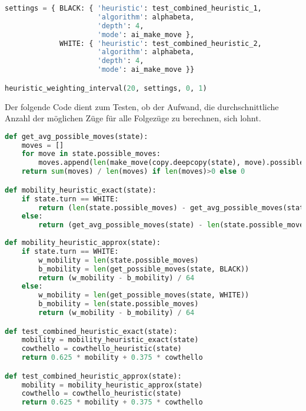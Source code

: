 \begin{lstlisting}[language=Python]
settings = { BLACK: { 'heuristic': test_combined_heuristic_1,
                      'algorithm': alphabeta,
                      'depth': 4,
                      'mode': ai_make_move },
             WHITE: { 'heuristic': test_combined_heuristic_2,
                      'algorithm': alphabeta,
                      'depth': 4,
                      'mode': ai_make_move }}

heuristic_weighting_interval(20, settings, 0, 1)
\end{lstlisting}

Der folgende Code dient zum Testen, ob der Aufwand, die
durchschnittliche Anzahl der möglichen Züge für alle Folgezüge zu
berechnen, sich lohnt.

\begin{lstlisting}[language=Python]
def get_avg_possible_moves(state):
    moves = []
    for move in state.possible_moves:
        moves.append(len(make_move(copy.deepcopy(state), move).possible_moves))
    return sum(moves) / len(moves) if len(moves)>0 else 0

def mobility_heuristic_exact(state):
    if state.turn == WHITE:
        return (len(state.possible_moves) - get_avg_possible_moves(state)) / 64
    else:
        return (get_avg_possible_moves(state) - len(state.possible_moves)) / 64
    
def mobility_heuristic_approx(state):
    if state.turn == WHITE:
        w_mobility = len(state.possible_moves)
        b_mobility = len(get_possible_moves(state, BLACK))
        return (w_mobility - b_mobility) / 64
    else:
        w_mobility = len(get_possible_moves(state, WHITE))
        b_mobility = len(state.possible_moves)
        return (w_mobility - b_mobility) / 64

def test_combined_heuristic_exact(state):
    mobility = mobility_heuristic_exact(state)
    cowthello = cowthello_heuristic(state)
    return 0.625 * mobility + 0.375 * cowthello

def test_combined_heuristic_approx(state):
    mobility = mobility_heuristic_approx(state)
    cowthello = cowthello_heuristic(state)
    return 0.625 * mobility + 0.375 * cowthello
\end{lstlisting}

